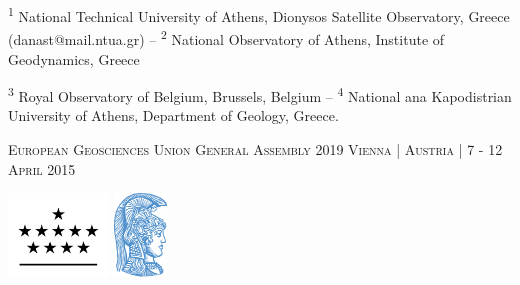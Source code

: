 \documentclass[landscape,a0paper,fontscale=0.315]{baposter} %
\begin{document}
\begin{poster}
{{\small \par{\textsuperscript{1} National Technical University of Athens, Dionysos Satellite Observatory, Greece (danast@mail.ntua.gr) -- \textsuperscript{2} National Observatory of Athens, Institute of Geodynamics, Greece} 
\par{\textsuperscript{3} Royal Observatory of Belgium, Brussels, Belgium --  \textsuperscript{4} National ana Kapodistrian University of Athens, Department of Geology, Greece. }} \vspace{0.3em}
\par{\textsc{European Geosciences Union General Assembly 2019 Vienna | Austria | 7 - 12 April 2015}} 
 }
{\includegraphics[height=6em]{../../logos/logo_orb.png} \includegraphics[height=6em]{../../logos/logo_uoa_blue.png}} %







\end{poster}
\end{document}
